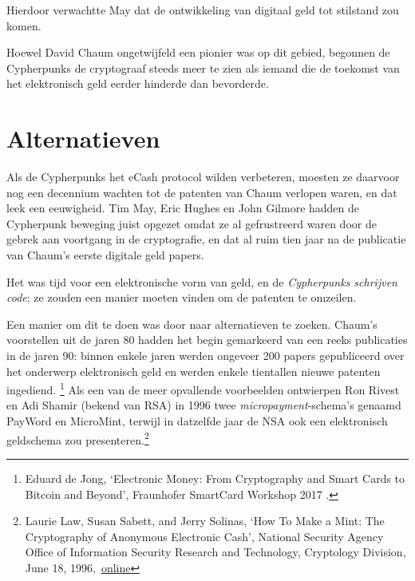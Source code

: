 \documentclass[
  a5paper,
  smalldemyvopaper,11pt,twoside,onecolumn,openright,extrafontsizes]{memoir}
\begin{document}
Hierdoor verwachtte May dat de ontwikkeling van digitaal geld tot
stilstand zou komen.

Hoewel David Chaum ongetwijfeld een pionier was op dit gebied, begonnen
de Cypherpunks de cryptograaf steeds meer te zien als iemand die de
toekomst van het elektronisch geld eerder hinderde dan bevorderde.

\section{Alternatieven}\label{alternatieven}

Als de Cypherpunks het eCash protocol wilden verbeteren, moesten ze
daarvoor nog een decennium wachten tot de patenten van Chaum verlopen
waren, en dat leek een eeuwigheid. Tim May, Eric Hughes en John Gilmore
hadden de Cypherpunk beweging juist opgezet omdat ze al gefrustreerd
waren door de gebrek aan voortgang in de cryptografie, en dat al ruim
tien jaar na de publicatie van Chaum's eerste digitale geld papers.

Het was tijd voor een elektronische vorm van geld, en de
\emph{Cypherpunks schrijven code}; ze zouden een manier moeten vinden om
de patenten te omzeilen.

Een manier om dit te doen was door naar alternatieven te zoeken. Chaum's
voorstellen uit de jaren 80 hadden het begin gemarkeerd van een reeks
publicaties in de jaren 90: binnen enkele jaren werden ongeveer 200
papers gepubliceerd over het onderwerp elektronisch geld en werden
enkele tientallen nieuwe patenten ingediend. \footnote{Eduard de Jong,
  `Electronic Money: From Cryptography and Smart Cards to Bitcoin and
  Beyond', Fraunhofer SmartCard Workshop 2017 .} Als een van de meer
opvallende voorbeelden ontwierpen Ron Rivest en Adi Shamir (bekend van
RSA) in 1996 twee \emph{micropayment}-schema's genaamd PayWord en
MicroMint, terwijl in datzelfde jaar de NSA ook een elektronisch
geldschema zou presenteren.\footnote{Laurie Law, Susan Sabett, and Jerry
  Solinas, `How To Make a Mint: The Cryptography of Anonymous Electronic
  Cash', National Security Agency Office of Information Security
  Research and Technology, Cryptology Division, June 18,
  1996,~\href{https://groups.csail.mit.edu/mac/classes/6.805/articles/money/nsamint/nsamint.htm}{online}}
\end{document}
